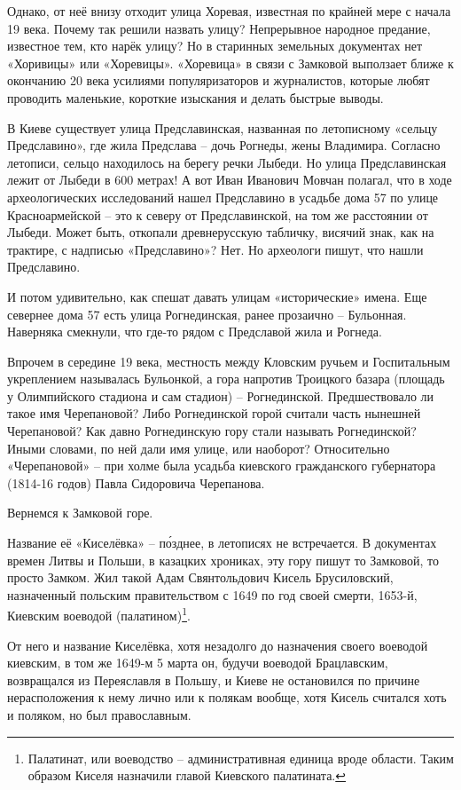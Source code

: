 Однако, от неё внизу отходит улица Хоревая, известная по крайней мере с начала 19 века. Почему так решили назвать улицу? Непрерывное народное предание, известное тем, кто нарёк улицу? Но в старинных земельных документах нет «Хоривицы» или «Хоревицы». «Хоревица» в связи с Замковой выползает ближе к окончанию 20 века усилиями популяризаторов и журналистов, которые любят проводить маленькие, короткие изыскания и делать быстрые выводы.

В Киеве существует улица Предславинская, названная по летописному «сельцу Предславино», где жила Предслава – дочь Рогнеды, жены Владимира. Согласно летописи, сельцо находилось на берегу речки Лыбеди. Но улица Предславинская лежит от Лыбеди в 600 метрах! А вот Иван Иванович Мовчан полагал, что в ходе археологических исследований нашел Предславино в усадьбе дома 57 по улице Красноармейской – это к северу от Предславинской, на том же расстоянии от Лыбеди. Может быть, откопали древнерусскую табличку, висячий знак, как на трактире, с надписью «Предславино»? Нет. Но археологи пишут, что нашли Предславино.

И потом удивительно, как спешат давать улицам «исторические» имена. Еще севернее дома 57 есть улица Рогнединская, ранее прозаично – Бульонная. Наверняка смекнули, что где-то рядом с Предславой жила и Рогнеда. 

Впрочем в середине 19 века, местность между Кловским ручьем и Госпитальным укреплением называлась Бульонкой, а гора напротив Троицкого базара (площадь у Олимпийского стадиона и сам стадион) – Рогнединской. Предшествовало ли такое имя Черепановой? Либо Рогнединской горой считали часть нынешней Черепановой? Как давно Рогнединскую гору стали называть Рогнединской? Иными словами, по ней дали имя улице, или наоборот? Относительно «Черепановой» – при холме была усадьба киевского гражданского губернатора (1814-16 годов) Павла Сидоровича Черепанова.

Вернемся к Замковой горе. 

Название её «Киселёвка» – п\'озднее, в летописях не встречается. В документах времен Литвы и Польши, в казацких хрониках, эту гору пишут то Замковой, то просто Замком. Жил такой Адам Свянтольдович Кисель Брусиловский, назначенный польским правительством с 1649 по год своей смерти, 1653-й, Киевским воеводой (палатином)\footnote{Палатинат, или воеводство – административная единица вроде области. Таким образом Киселя назначили главой Киевского палатината.}. 

От него и название Киселёвка, хотя незадолго до назначения своего воеводой киевским, в том же 1649-м 5 марта он, будучи воеводой Брацлавским, возвращался из Переяславля в Польшу, и Киеве не остановился по причине нерасположения к нему лично или к полякам вообще, хотя Кисель считался хоть и поляком, но был православным. 

